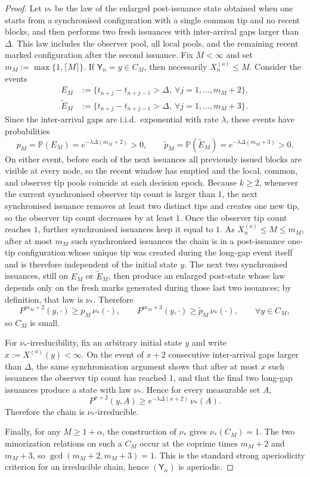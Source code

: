 \documentclass[10pt,a4paper]{amsart}
\renewcommand{\P}{{\mathbb P}}
\begin{document}
\begin{proof}
Let $\nu_\ast$ be the law of the enlarged post-issuance state obtained when one starts from a synchronised configuration with a single common tip and no recent blocks, and then performs two fresh issuances with inter-arrival gaps larger than $\Delta$. This law includes the observer pool, all local pools, and the remaining recent marked configuration after the second issuance. Fix $M<\infty$ and set $m_M:=\max\{1,\lceil M\rceil\}$. If $\mathsf{Y}_n=y\in C_M$, then necessarily $X_n^{(o)}\le M$. Consider the events
\begin{align*}
   E_M&:=\{t_{n+j}-t_{n+j-1}>\Delta,\ \forall j=1,\dots,m_M+2\},\\
   \widetilde E_M&:=\{t_{n+j}-t_{n+j-1}>\Delta,\ \forall j=1,\dots,m_M+3\}.
\end{align*}
Since the inter-arrival gaps are i.i.d.\ exponential with rate $\lambda$, these events have probabilities
\[
   p_M = \P(E_M)=e^{-\lambda\Delta (m_M+2)}>0,
   \qquad
   \widetilde p_M = \P(\widetilde E_M)=e^{-\lambda\Delta (m_M+3)}>0.
\]
On either event, before each of the next issuances all previously issued blocks are visible at every node, so the recent window has emptied and the local, common, and observer tip pools coincide at each decision epoch. Because $k\ge 2$, whenever the current synchronised observer tip count is larger than $1$, the next synchronised issuance removes at least two distinct tips and creates one new tip, so the observer tip count decreases by at least $1$. Once the observer tip count reaches $1$, further synchronised issuances keep it equal to $1$. As $X_n^{(o)}\le M\le m_M$, after at most $m_M$ such synchronised issuances the chain is in a post-issuance one-tip configuration whose unique tip was created during the long-gap event itself and is therefore independent of the initial state $y$. The next two synchronised issuances, still on $E_M$ or $\widetilde E_M$, then produce an enlarged post-state whose law depends only on the fresh marks generated during those last two issuances; by definition, that law is $\nu_\ast$. Therefore
\[
   P^{m_M+2}(y,\cdot)\ge p_M\,\nu_\ast(\cdot),
   \qquad
   P^{m_M+3}(y,\cdot)\ge \widetilde p_M\,\nu_\ast(\cdot),
   \qquad \forall y\in C_M,
\]
so $C_M$ is small.

For $\nu_\ast$-irreducibility, fix an arbitrary initial state $y$ and write $x:=X^{(o)}(y)<\infty$. On the event of $x+2$ consecutive inter-arrival gaps larger than $\Delta$, the same synchronisation argument shows that after at most $x$ such issuances the observer tip count has reached $1$, and that the final two long-gap issuances produce a state with law $\nu_\ast$. Hence for every measurable set $A$,
\[
   P^{x+2}(y,A)\ge e^{-\lambda\Delta(x+2)}\,\nu_\ast(A).
\]
Therefore the chain is $\nu_\ast$-irreducible.

Finally, for any $M\ge 1+\alpha$, the construction of $\nu_\ast$ gives $\nu_\ast(C_M)=1$. The two minorization relations on such a $C_M$ occur at the coprime times $m_M+2$ and $m_M+3$, so $\gcd(m_M+2,m_M+3)=1$. This is the standard strong aperiodicity criterion for an irreducible chain, hence $(\mathsf{Y}_n)$ is aperiodic.
\end{proof}
\end{document}
